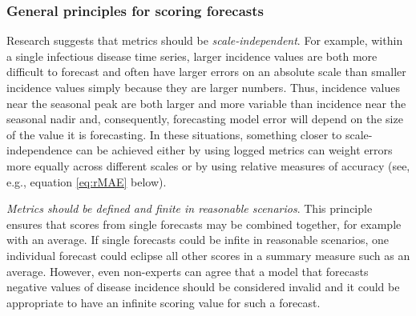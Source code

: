 \documentclass[a4paper]{article}
\begin{document}
\subsubsection*{General principles for scoring forecasts}
Research suggests that metrics should be \textit{scale-independent}.\cite{Armstrong2001,Hyndman2006}
For example, within a single infectious disease time series, larger incidence values are both more difficult to forecast and often have larger errors on an absolute scale than smaller incidence values simply because they are larger numbers. %
Thus, incidence values near the seasonal peak are both larger and more variable than incidence near the seasonal nadir and, consequently, forecasting model error will depend on the size of the value it is forecasting.
In these situations, something closer to scale-independence can be achieved either by using logged metrics can weight errors more equally across different scales or by using relative measures of accuracy (see, e.g., equation \ref{eq:rMAE} below).\cite{Reich2016}

\textit{Metrics should be defined and finite in reasonable scenarios}.
This principle ensures that scores from single forecasts may be combined together, for example with an average.
If single forecasts could be infite in reasonable scenarios, one individual forecast could eclipse all other scores in a summary measure such as an average. 
However, even non-experts can agree that a model that forecasts negative values of disease incidence should be considered invalid and it could be appropriate to have an infinite scoring value for such a forecast.
\end{document}

